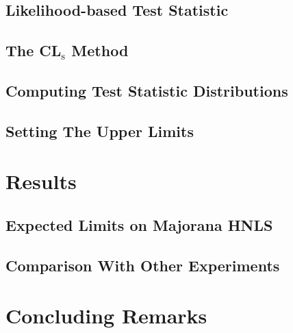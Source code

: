 \subsection{Likelihood-based Test Statistic}

\subsection{The CL$_{\mathrm{s}}$ Method}

\subsection{Computing Test Statistic Distributions}

\subsection{Setting The Upper Limits}

\section{Results}

\subsection{Expected Limits on Majorana HNLS}

\subsection{Comparison With Other Experiments}

\section{Concluding Remarks}
